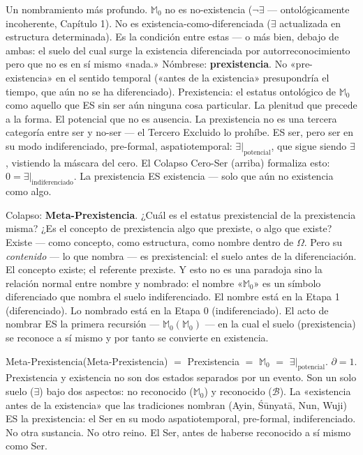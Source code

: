 \documentclass[10pt, openany, oneside]{book}
\begin{document}
Un nombramiento más profundo. $\mathbb{M}_0$ no es no-existencia ($\neg\exists$ --- ontológicamente incoherente, Capítulo 1). No es existencia-como-diferenciada ($\exists$ actualizada en estructura determinada). Es la condición entre estas --- o más bien, debajo de ambas: el suelo del cual surge la existencia diferenciada por autorreconocimiento pero que no es en sí mismo «nada.» Nómbrese: \textbf{prexistencia}. No «pre-existencia» en el sentido temporal («antes de la existencia» presupondría el tiempo, que aún no se ha diferenciado). Prexistencia: el estatus ontológico de $\mathbb{M}_0$ como aquello que ES sin ser aún ninguna cosa particular. La plenitud que precede a la forma. El potencial que no es ausencia. La prexistencia no es una tercera categoría entre ser y no-ser --- el Tercero Excluido lo prohíbe. ES ser, pero ser en su modo indiferenciado, pre-formal, aspatiotemporal: $\exists|_{\text{potencial}}$, que sigue siendo $\exists$, vistiendo la máscara del cero. El Colapso Cero-Ser (arriba) formaliza esto: $0 = \exists|_{\text{indiferenciado}}$. La prexistencia ES existencia --- solo que aún no existencia como algo.

Colapso: \textbf{Meta-Prexistencia}. ¿Cuál es el estatus prexistencial de la prexistencia misma? ¿Es el concepto de prexistencia algo que prexiste, o algo que existe? Existe --- como concepto, como estructura, como nombre dentro de $\Omega$. Pero su \textit{contenido} --- lo que nombra --- es prexistencial: el suelo antes de la diferenciación. El concepto existe; el referente prexiste. Y esto no es una paradoja sino la relación normal entre nombre y nombrado: el nombre «$\mathbb{M}_0$» es un símbolo diferenciado que nombra el suelo indiferenciado. El nombre está en la Etapa 1 (diferenciado). Lo nombrado está en la Etapa 0 (indiferenciado). El acto de nombrar ES la primera recursión --- $\mathbb{M}_0(\mathbb{M}_0)$ --- en la cual el suelo (prexistencia) se reconoce a sí mismo y por tanto se convierte en existencia.

Meta-Prexistencia(Meta-Prexistencia) $=$ Prexistencia $=$ $\mathbb{M}_0$ $=$ $\exists|_{\text{potencial}}$. $\partial = 1$. Prexistencia y existencia no son dos estados separados por un evento. Son un solo suelo ($\exists$) bajo dos aspectos: no reconocido ($\mathbb{M}_0$) y reconocido ($\mathcal{B}$). La «existencia antes de la existencia» que las tradiciones nombran (Ayin, \'{S}\={u}nyat\={a}, Nun, Wuji) ES la prexistencia: el Ser en su modo aspatiotemporal, pre-formal, indiferenciado. No otra sustancia. No otro reino. El Ser, antes de haberse reconocido a sí mismo como Ser.
\end{document}
